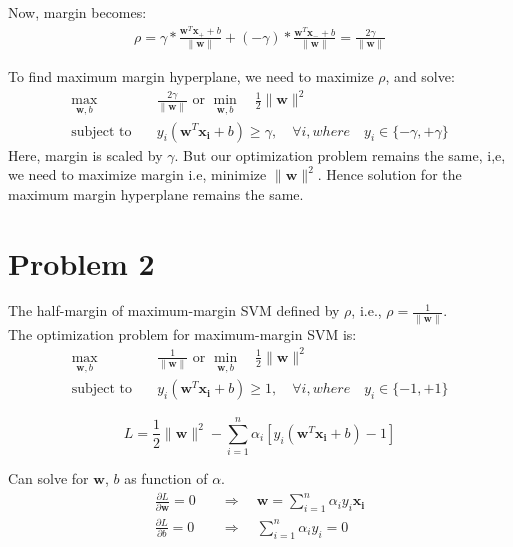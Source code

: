 \documentclass[12pt]{article}
\begin{document}
Now, margin becomes:
\begin{equation}
    \begin{aligned}
        \rho = \gamma* \frac{\mathbf{w}^T \mathbf{x_+} + b}{\|\mathbf{w}\|} + (-\gamma)* \frac{\mathbf{w}^T \mathbf{x_-} + b}{\|\mathbf{w}\|} = \frac{2\gamma}{\|\mathbf{w}\|}
    \end{aligned}
\end{equation}

To find maximum margin hyperplane, we need to maximize $\rho$, and solve:
\begin{equation}
    \begin{aligned}
        \max_{\mathbf{w}, b} \quad & \frac{2\gamma}{\|\mathbf{w}\|} \text{ or } \min_{\mathbf{w}, b} \quad \frac{1}{2} \|\mathbf{w}\|^2 \\
        \text{subject to} \quad & y_i(\mathbf{w}^T \mathbf{x_i} + b) \geq \gamma, \quad \forall i, where \quad y_i \in \{-\gamma, +\gamma\}
    \end{aligned}
\end{equation}
Here, margin is scaled by $\gamma$. But our optimization problem remains the same, i,e, we need to maximize margin i.e,  minimize $\|\mathbf{w}\|^2$.
Hence solution for the maximum margin hyperplane remains the same.

\section*{Problem 2}
The half-margin of maximum-margin SVM defined by $\rho$, i.e., $\rho = \frac{1}{\|\mathbf{w}\|}$.\\
The optimization problem for maximum-margin SVM is:
\begin{equation}
    \begin{aligned}
        \max_{\mathbf{w}, b} \quad & \frac{1}{\|\mathbf{w}\|} \text{ or } \min_{\mathbf{w}, b} \quad \frac{1}{2} \|\mathbf{w}\|^2 \\
        \text{subject to} \quad & y_i(\mathbf{w}^T \mathbf{x_i} + b) \geq 1, \quad \forall i, where \quad y_i \in \{-1, +1\}
    \end{aligned}
\end{equation}

\begin{equation}
    L = \frac{1}{2} \|\mathbf{w}\|^2 - \sum_{i=1}^{n} \alpha_i[y_i(\mathbf{w}^T \mathbf{x_i} + b) - 1]
\end{equation}

Can solve for $\mathbf{w}$, $b$ as function of $\alpha$.
\begin{equation}
    \begin{aligned}
        \frac{\partial L}{\partial \mathbf{w}} = 0 \quad & \Rightarrow \quad \mathbf{w} = \sum_{i=1}^{n} \alpha_i y_i \mathbf{x_i} \\
        \frac{\partial L}{\partial b} = 0 \quad & \Rightarrow \quad \sum_{i=1}^{n} \alpha_i y_i = 0
    \end{aligned}
\end{equation}
\end{document}
